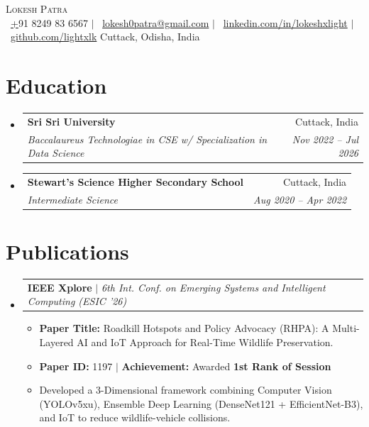 \documentclass[a4paper,10pt]{article}
\makeatletter
\newcommand{\resumeItem}[1]{
  \item\small{
    {#1 \vspace{-2pt}}
  }
}
\newcommand{\resumeSubheading}[4]{
  \vspace{-1pt}\item
    \begin{tabular*}{0.97\textwidth}[t]{l@{\extracolsep{\fill}}r}
      \textbf{#1} & #2 \\
      \textit{\small#3} & \textit{\small #4} \\
    \end{tabular*}\vspace{-5pt}
}
\newcommand{\resumeProjectHeading}[2]{
    \item
    \begin{tabular*}{0.97\textwidth}{l@{\extracolsep{\fill}}r}
      \small#1 & #2 \\
    \end{tabular*}\vspace{-7pt}
}
\newcommand{\resumeSubHeadingListStart}{\begin{itemize}[leftmargin=0.15in, label={}]}
\newcommand{\resumeSubHeadingListEnd}{\end{itemize}}
\newcommand{\resumeItemListStart}{\begin{itemize}}
\newcommand{\resumeItemListEnd}{\end{itemize}\vspace{-5pt}}
\makeatother
\begin{document}
\begin{center}
    {\Huge \scshape Lokesh Patra} \\ \vspace{10pt}
    \faPhone\ \href{tel:+918249836567}+91 8249 83 6567 \hspace{1pt} $|$ \hspace{1pt} 
    \faEnvelope\ \href{mailto:lokesh0patra@gmail.com}{lokesh0patra@gmail.com} \hspace{1pt} $|$ \hspace{1pt} 
    \faLinkedin\ \href{https://linkedin.com/in/lokeshxlight}{linkedin.com/in/lokeshxlight} \hspace{1pt} $|$ \hspace{1pt} 
    \faGithub\ \href{https://github.com/lightxlk}{github.com/lightxlk} \hspace{1pt} \hspace{1pt}
    \vspace{2pt}
    \small Cuttack, Odisha, India
\end{center}

\section{Education}
  \resumeSubHeadingListStart
    \resumeSubheading
      {Sri Sri University}{Cuttack, India}
      {Baccalaureus Technologiae in CSE w/ Specialization in Data Science} {Nov 2022 -- Jul 2026}
    \resumeSubheading
      {Stewart's Science Higher Secondary School}{Cuttack, India}
      {Intermediate Science} {Aug 2020 -- Apr 2022}
  \resumeSubHeadingListEnd

\section{Publications}
  \resumeSubHeadingListStart
    \resumeProjectHeading
      {\textbf{IEEE Xplore} $|$ \emph{6th Int. Conf. on Emerging Systems and Intelligent Computing (ESIC '26)}}{}
      \resumeItemListStart
        \resumeItem{\textbf{Paper Title:} Roadkill Hotspots and Policy Advocacy (RHPA): A Multi-Layered AI and IoT Approach for Real-Time Wildlife Preservation.}
        \resumeItem{\textbf{Paper ID:} 1197 $|$ \textbf{Achievement:} Awarded \textbf{1st Rank of Session}}
        \resumeItem{Developed a 3-Dimensional framework combining Computer Vision (YOLOv5xu), Ensemble Deep Learning (DenseNet121 + EfficientNet-B3), and IoT to reduce wildlife-vehicle collisions.}
      \resumeItemListEnd
  \resumeSubHeadingListEnd
\end{document}
